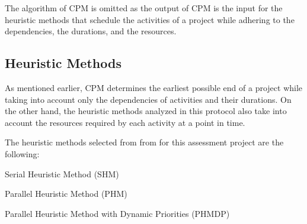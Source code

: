 
The algorithm of CPM is omitted as the output of CPM is the input for the heuristic methods that schedule the activities of a project while adhering to the dependencies, the durations, and the resources.

\subsection{Heuristic Methods}
As mentioned earlier, CPM determines the earliest possible end of a project while taking into account only the dependencies of activities and their durations.
On the other hand, the heuristic methods analyzed in this protocol also take into account the resources required by each activity at a point in time.

The heuristic methods selected from from  \cite{Fiala2008} for this assessment project are the following:

\begin{tight_itemize}
	\item Serial Heuristic Method (SHM)
	\item Parallel Heuristic Method (PHM)
	\item Parallel Heuristic Method with Dynamic Priorities (PHMDP)
\end{tight_itemize}

